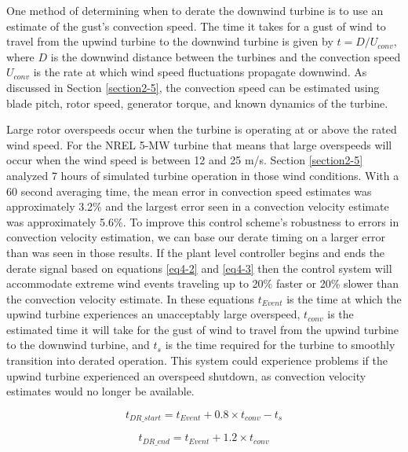 One method of determining when to derate the downwind turbine is to use an estimate of the gust's convection speed. The time it takes for a gust of wind to travel from the upwind turbine to the downwind turbine is given by $t = D/U_{conv}$, where $D$ is the downwind distance between the turbines and the convection speed $U_{conv}$ is the rate at which wind speed fluctuations propagate downwind. As discussed in Section \ref{section2-5}, the convection speed can be estimated using blade pitch, rotor speed, generator torque, and known dynamics of the turbine.

Large rotor overspeeds occur when the turbine is operating at or above the rated wind speed. For the NREL 5-MW turbine that means that large overspeeds will occur when the wind speed is between 12 and 25 m/s. Section \ref{section2-5} analyzed 7 hours of simulated turbine operation in those wind conditions. With a 60 second averaging time, the mean error in convection speed estimates was approximately 3.2\% and the largest error seen in a convection velocity estimate was approximately 5.6\%. To improve this control scheme's robustness to errors in convection velocity estimation, we can base our derate timing on a larger error than was seen in those results. If the plant level controller begins and ends the derate signal based on equations \ref{eq4-2} and \ref{eq4-3} then the control system will accommodate extreme wind events traveling up to 20\% faster or 20\% slower than the convection velocity estimate. In these equations $t_{Event}$ is the time at which the upwind turbine experiences an unacceptably large overspeed, $t_{conv}$ is the estimated time it will take for the gust of wind to travel from the upwind turbine to the downwind turbine, and $t_s$ is the time required for the turbine to smoothly transition into derated operation. This system could experience problems if the upwind turbine experienced an overspeed shutdown, as convection velocity estimates would no longer be available.


\begin{equation}
	t_{DR\_start} = t_{Event} + 0.8 \times t_{conv} - t_s \label{eq4-2}
\end{equation}

\begin{equation}
	t_{DR\_end} = t_{Event} + 1.2 \times t_{conv} \label{eq4-3}
\end{equation}



